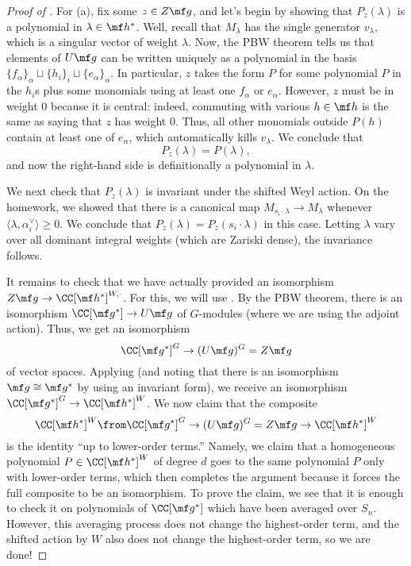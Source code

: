 \documentclass[../notes.tex]{subfiles}
\begin{document}
\begin{proof}[Proof of ]
	For (a), fix some $z\in Z\mf g$, and let's begin by showing that $P_z(\lambda)$ is a polynomial in $\lambda\in\mf h^*$. Well, recall that $M_\lambda$ has the single generator $v_\lambda$, which is a singular vector of weight $\lambda$. Now, the PBW theorem tells us that elements of $U\mf g$ can be written uniquely as a polynomial in the basis $\{f_\alpha\}_\alpha\sqcup\{h_i\}_i\sqcup\{e_\alpha\}_\alpha$. In particular, $z$ takes the form $P$ for some polynomial $P$ in the $h_i$s plus some monomials using at least one $f_\alpha$ or $e_\alpha$. However, $z$ must be in weight $0$ because it is central: indeed, commuting with various $h\in\mf h$ is the same as saying that $z$ has weight $0$. Thus, all other monomials outside $P(h)$ contain at least one of $e_\alpha$, which automatically kills $v_\lambda$. We conclude that
	\[P_z(\lambda)=P(\lambda),\]
	and now the right-hand side is definitionally a polynomial in $\lambda$.

	We next check that $P_z(\lambda)$ is invariant under the shifted Weyl action. On the homework, we showed that there is a canonical map $M_{s_i\cdot\lambda}\to M_\lambda$ whenever $\langle\lambda,\alpha_i^\lor\rangle\ge0$. We conclude that $P_z(\lambda)=P_z(s_i\cdot\lambda)$ in this case. Letting $\lambda$ vary over all dominant integral weights (which are Zariski dense), the invariance follows.

	It remains to check that we have actually provided an isomorphism $Z\mf g\to\CC[\mf h^*]^{W,\cdot}$. For this, we will use . By the PBW theorem, there is an isomorphism $\CC[\mf g^*]\to U\mf g$ of $G$-modules (where we are using the adjoint action). Thus, we get an isomorphism
	\[\CC[\mf g^*]^G\to(U\mf g)^G=Z\mf g\]
	of vector spaces. Applying  (and noting that there is an isomorphism $\mf g\cong\mf g^*$ by using an invariant form), we receive an isomorphism $\CC[\mf g^*]^G\to\CC[\mf h^*]^W$. We now claim that the composite
	\[\CC[\mf h^*]^W\from\CC[\mf g^*]^G\to(U\mf g)^G=Z\mf g\to\CC[\mf h^*]^W\]
	is the identity ``up to lower-order terms.'' Namely, we claim that a homogeneous polynomial $P\in\CC[\mf h^*]^W$ of degree $d$ goes to the same polynomial $P$ only with lower-order terms, which then completes the argument because it forces the full composite to be an isomorphism. To prove the claim, we see that it is enough to check it on polynomials of $\CC[\mf g^*]$ which have been averaged over $S_n$. However, this averaging process does not change the highest-order term, and the shifted action by $W$ also does not change the highest-order term, so we are done!
\end{proof}
\end{document}
